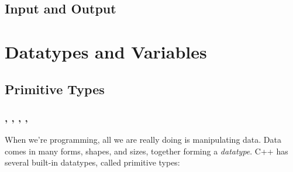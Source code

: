 \documentclass{article}
\begin{document}
\subsection{Input and Output}

\section{Datatypes and Variables}

\subsection{Primitive Types}

\subsubsection{, , , , } 

\noindent
When we're programming, all we are really doing is manipulating data. Data comes in many forms, shapes, and sizes, together forming a \textit{datatype}. C++ has several built-in datatypes, called primitive types:
\end{document}
